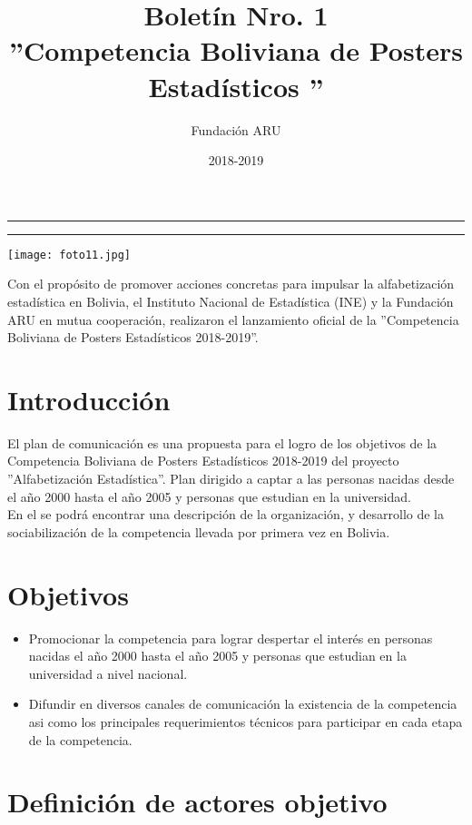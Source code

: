 \documentclass{article}
\title{\textbf{Boletín Nro. 1} \\ ''Competencia Boliviana de Posters Estadísticos ''}
\author{Fundación ARU}
\date{2018-2019 }
\begin{document}
\maketitle

\hrule
\hrule

\vspace{1cm}

\parbox{8cm}{\texttt{[image: foto11.jpg]}}\parbox{8cm}{Con el propósito de promover acciones concretas para impulsar la alfabetización estadística en Bolivia, 
el Instituto Nacional de Estadística (INE) y la Fundación ARU en mutua cooperación, realizaron el lanzamiento
 oficial de la ''Competencia Boliviana de Posters Estadísticos 2018-2019''. }

\section{Introducción}

El plan de comunicación es una propuesta para el logro de los objetivos de la Competencia Boliviana de Posters Estadísticos 2018-2019 del proyecto ''Alfabetización Estadística''. Plan dirigido a captar a las personas nacidas desde el año 2000 hasta el año 2005 y personas que estudian en la universidad.\\

En el se podrá encontrar una descripción de la organización, y desarrollo de la sociabilización de la competencia llevada por primera vez en Bolivia.


\section{Objetivos}

\begin{itemize}
\item Promocionar la competencia para lograr despertar el interés en personas nacidas el año 2000 hasta el año 2005 y personas que estudian en la universidad a nivel nacional. 

\item Difundir en diversos canales de comunicación la existencia de la competencia asi como los principales requerimientos técnicos para participar en cada etapa de la competencia.
\end{itemize} 

\section{Definición de actores objetivo}
\end{document}
